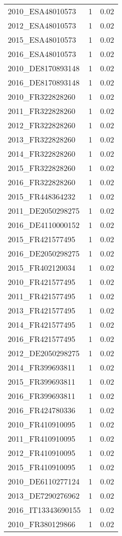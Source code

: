 \begin{table*}[htbp]
\begin{tabular}{lrr}
2010_ESA48010573 & 1 & 0.02 \\
2012_ESA48010573 & 1 & 0.02 \\
2015_ESA48010573 & 1 & 0.02 \\
2016_ESA48010573 & 1 & 0.02 \\
2010_DE8170893148 & 1 & 0.02 \\
2016_DE8170893148 & 1 & 0.02 \\
2010_FR322828260 & 1 & 0.02 \\
2011_FR322828260 & 1 & 0.02 \\
2012_FR322828260 & 1 & 0.02 \\
2013_FR322828260 & 1 & 0.02 \\
2014_FR322828260 & 1 & 0.02 \\
2015_FR322828260 & 1 & 0.02 \\
2016_FR322828260 & 1 & 0.02 \\
2015_FR448364232 & 1 & 0.02 \\
2011_DE2050298275 & 1 & 0.02 \\
2016_DE4110000152 & 1 & 0.02 \\
2015_FR421577495 & 1 & 0.02 \\
2016_DE2050298275 & 1 & 0.02 \\
2015_FR402120034 & 1 & 0.02 \\
2010_FR421577495 & 1 & 0.02 \\
2011_FR421577495 & 1 & 0.02 \\
2013_FR421577495 & 1 & 0.02 \\
2014_FR421577495 & 1 & 0.02 \\
2016_FR421577495 & 1 & 0.02 \\
2012_DE2050298275 & 1 & 0.02 \\
2014_FR399693811 & 1 & 0.02 \\
2015_FR399693811 & 1 & 0.02 \\
2016_FR399693811 & 1 & 0.02 \\
2016_FR424780336 & 1 & 0.02 \\
2010_FR410910095 & 1 & 0.02 \\
2011_FR410910095 & 1 & 0.02 \\
2012_FR410910095 & 1 & 0.02 \\
2015_FR410910095 & 1 & 0.02 \\
2010_DE6110277124 & 1 & 0.02 \\
2013_DE7290276962 & 1 & 0.02 \\
2016_IT13343690155 & 1 & 0.02 \\
2010_FR380129866 & 1 & 0.02 \\

\end{tabular}
\end{table*}
